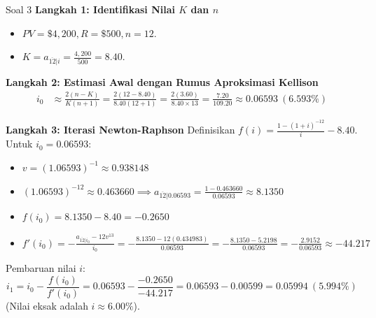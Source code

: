 \documentclass[11pt,a4paper]{article}
\begin{document}
\begin{solutionbox}{Soal 3}
\textbf{Langkah 1: Identifikasi Nilai $K$ dan $n$}
\begin{itemize}
    \item $PV = \$4{,}200, R = \$500, n = 12$.
    \item $K = a_{\overline{12}|i} = \frac{4{,}200}{500} = 8.40$.
\end{itemize}

\textbf{Langkah 2: Estimasi Awal dengan Rumus Aproksimasi Kellison}
\begin{align*}
    i_0 &\approx \frac{2(n - K)}{K(n + 1)} = \frac{2(12 - 8.40)}{8.40(12 + 1)} = \frac{2(3.60)}{8.40 \times 13} = \frac{7.20}{109.20} \approx \mathbf{0.06593 \ (6.593\%)}
\end{align*}

\textbf{Langkah 3: Iterasi Newton-Raphson}
Definisikan $f(i) = \frac{1 - (1+i)^{-12}}{i} - 8.40$.
Untuk $i_0 = 0.06593$:
\begin{itemize}
    \item $v = (1.06593)^{-1} \approx 0.938148$
    \item $(1.06593)^{-12} \approx 0.463660 \implies a_{\overline{12}|0.06593} = \frac{1 - 0.463660}{0.06593} \approx 8.1350$
    \item $f(i_0) = 8.1350 - 8.40 = -0.2650$
    \item $f'(i_0) = -\frac{a_{\overline{12}|i_0} - 12 v^{13}}{i_0} = -\frac{8.1350 - 12(0.434983)}{0.06593} = -\frac{8.1350 - 5.2198}{0.06593} = -\frac{2.9152}{0.06593} \approx -44.217$
\end{itemize}
Pembaruan nilai $i$:
\begin{equation*}
    i_1 = i_0 - \frac{f(i_0)}{f'(i_0)} = 0.06593 - \frac{-0.2650}{-44.217} = 0.06593 - 0.00599 = \mathbf{0.05994 \ (5.994\%)}
\end{equation*}
(Nilai eksak adalah $i \approx 6.00\%$).
\end{solutionbox}

\vspace{1.5em}
\end{document}
